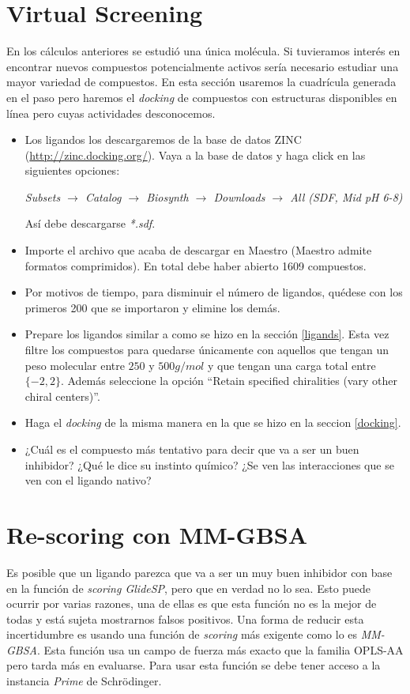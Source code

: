 \documentclass{article}
\begin{document}
\section{Virtual Screening}
En los cálculos anteriores se estudió una única molécula. Si tuvieramos interés en encontrar nuevos compuestos potencialmente activos sería necesario estudiar una mayor variedad de compuestos. En esta sección usaremos la cuadrícula generada en el paso \label{grid} pero haremos el \emph{docking} de compuestos con estructuras disponibles en línea pero cuyas actividades desconocemos.
\begin{itemize}
    \item Los ligandos los descargaremos de la base de datos ZINC (\url{http://zinc.docking.org/}). Vaya a la base de datos y haga click en las siguientes opciones:
    \begin{center}
    \emph{Subsets $\rightarrow$ Catalog $\rightarrow$ Biosynth $\rightarrow$ Downloads $\rightarrow$ All (SDF, Mid pH 6-8)}
    \end{center}
    Así debe descargarse \emph{*.sdf}.
    \item Importe el archivo que acaba de descargar en Maestro (Maestro admite formatos comprimidos). En total debe haber abierto 1609 compuestos.
    \item Por motivos de tiempo, para disminuir el número de ligandos, quédese con los primeros 200 que se importaron y elimine los demás.
    \item Prepare los ligandos similar a como se hizo en la sección \ref{ligands}. Esta vez filtre los compuestos para quedarse únicamente con aquellos que tengan un peso molecular entre $250$ y $500g/mol$ y que tengan una carga total entre $\{-2,2\}$. Además seleccione la opción ``Retain specified chiralities (vary other chiral centers)''.
    \item Haga el \emph{docking} de la misma manera en la que se hizo en la seccion \ref{docking}.
    \item ¿Cuál es el compuesto más tentativo para decir que va a ser un buen inhibidor? ¿Qué le dice su instinto químico? ¿Se ven las interacciones que se ven con el ligando nativo?
\end{itemize}

\section{Re-scoring con MM-GBSA}
Es posible que un ligando parezca que va a ser un muy buen inhibidor con base en la función de \emph{scoring GlideSP}, pero que en verdad no lo sea. Esto puede ocurrir por varias razones, una de ellas es que esta función no es la mejor de todas y está sujeta mostrarnos falsos positivos. Una forma de reducir esta incertidumbre es usando una función de \emph{scoring} más exigente como lo es \emph{MM-GBSA}. Esta función usa un campo de fuerza más exacto que la familia OPLS-AA pero tarda más en evaluarse. Para usar esta función se debe tener acceso a la instancia \emph{Prime} de Schr\"odinger.
\end{document}
